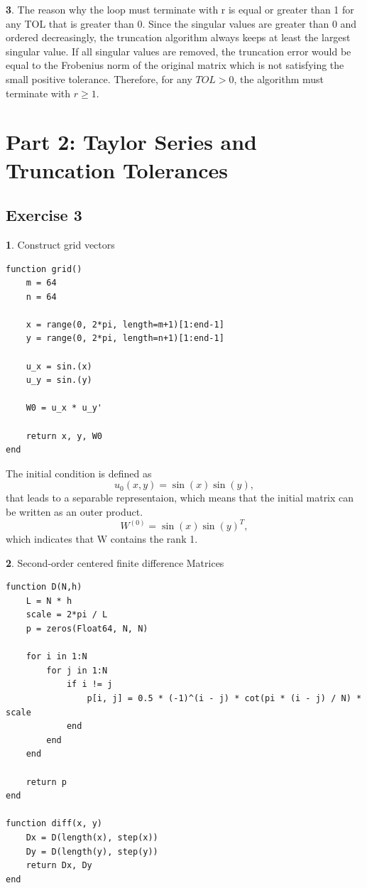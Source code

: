 \documentclass[11pt]{article}
\begin{document}
\vspace{1.5em}
\textbf{3}. The reason why the loop must terminate with r is equal or greater than 1 for any TOL that is greater than 0.
\vspace{1.5em}
Since the singular values are greater than 0 and ordered decreasingly, the truncation algorithm always keeps at least the largest singular value. If all singular values are removed, the truncation error would be equal to the Frobenius norm of the original matrix which is not satisfying the small positive tolerance. Therefore, for any $TOL > 0$, the algorithm must terminate
with $r \geq 1$.



\section*{Part 2: Taylor Series and Truncation Tolerances}
\subsection*{Exercise 3}
\textbf{1}. Construct grid vectors

\begin{lstlisting}
function grid()
    m = 64
    n = 64

    x = range(0, 2*pi, length=m+1)[1:end-1]
    y = range(0, 2*pi, length=n+1)[1:end-1]

    u_x = sin.(x)
    u_y = sin.(y)

    W0 = u_x * u_y'

    return x, y, W0
end

\end{lstlisting}
The initial condition is defined as
\[
u_0(x,y) = \sin(x)\sin(y),
\]
that leads to a separable representaion, which means that the initial matrix can be written as an outer product.
\[
W^{(0)} = \sin(x)\sin(y)^T,
\]
which indicates that W contains the rank 1.

\vspace{1.5em}
\textbf{2}. Second-order centered finite difference Matrices

\begin{lstlisting}
function D(N,h)
    L = N * h
    scale = 2*pi / L
    p = zeros(Float64, N, N)

    for i in 1:N
        for j in 1:N
            if i != j
                p[i, j] = 0.5 * (-1)^(i - j) * cot(pi * (i - j) / N) * scale
            end
        end
    end

    return p
end

function diff(x, y)
    Dx = D(length(x), step(x))
    Dy = D(length(y), step(y))
    return Dx, Dy
end

\end{lstlisting}
\end{document}
